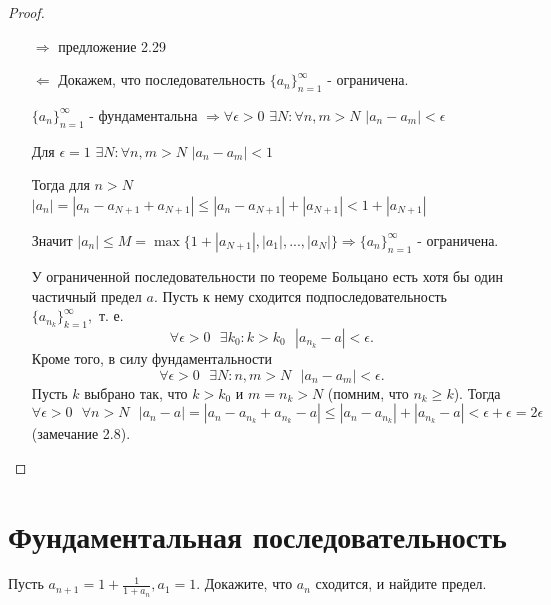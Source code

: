 	\begin{proof}
		\begin{itemize}
			\item[$\Rightarrow$] предложение 2.29
		    \item[$\Leftarrow$] Докажем, что последовательность $\{a_n\}^{\infty}_{n = 1}$ - ограничена.
		    
		    $\{a_n\}^{\infty}_{n = 1}$ - фундаментальна $\Rightarrow \forall \epsilon > 0$ $\exists N: \forall n, m > N$ $|a_n - a_m| < \epsilon$
		    
		    Для $\epsilon = 1$ $\exists N: \forall n, m > N$ $|a_n - a_m| < 1$
		    
		    Тогда для $n > N$ $|a_n| = |a_n - a_{N + 1} + a_{N + 1}| \leqslant |a_n - a_{N + 1}| + |a_{N + 1}| < 1 + |a_{N + 1}|$
		    
		    Значит $|a_n| \leqslant M = \max\{1 + |a_{N + 1}|, |a_1|, ..., |a_N|\} \Rightarrow \{a_n\}^{\infty}_{n = 1}$ - ограничена.
		    
		    У ограниченной последовательности по теореме Больцано есть хотя бы один частичный предел $a$. Пусть к нему сходится подпоследовательность $\{a_{n_k}\}^{\infty}_{k = 1},$ т. е.
		    \[ \forall \epsilon > 0 \text{ } \exists k_0: k > k_0 \text{ } |a_{n_k} - a| < \epsilon. \]
		    Кроме того, в силу фундаментальности
		    \[ \forall \epsilon > 0 \text{ } \exists N: n, m > N \text{ } |a_n - a_m| < \epsilon. \]
		    Пусть $k$ выбрано так, что $k > k_0$ и $m = n_k > N$ (помним, что $n_k \geqslant k$). Тогда 
		    \[ \forall \epsilon > 0 \text{ } \forall n > N \text{ } |a_n - a| = |a_n - a_{n_k} + a_{n_k} - a| \leqslant |a_n - a_{n_k}| + |a_{n_k} - a| < \epsilon + \epsilon = 2\epsilon \]
		    (замечание 2.8).
		\end{itemize}
	\end{proof}
	
	\section{Фундаментальная последовательность}
	
	\begin{example}
		Пусть $a_{n + 1} = 1 + \frac{1}{1 + a_n}, a_1 = 1$. Докажите, что $a_n$ сходится, и найдите предел.
	\end{example}
	
